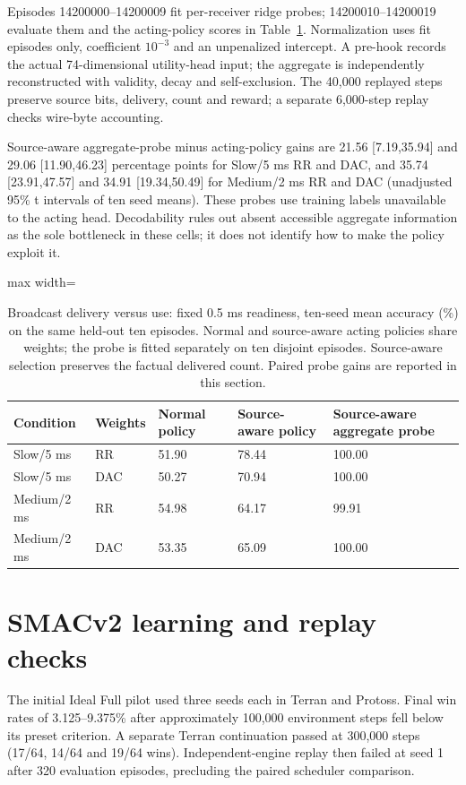 \documentclass[11pt,a4paper]{article}
\begin{document}
Episodes 14200000--14200009 fit per-receiver ridge probes; 14200010--14200019 evaluate them and the acting-policy scores in Table~\ref{tab:broadcast_use}. Normalization uses fit episodes only, coefficient $10^{-3}$ and an unpenalized intercept. A pre-hook records the actual 74-dimensional utility-head input; the aggregate is independently reconstructed with validity, decay and self-exclusion. The 40,000 replayed steps preserve source bits, delivery, count and reward; a separate 6,000-step replay checks wire-byte accounting.

Source-aware aggregate-probe minus acting-policy gains are 21.56 [7.19,35.94] and 29.06 [11.90,46.23] percentage points for Slow/5 ms RR and DAC, and 35.74 [23.91,47.57] and 34.91 [19.34,50.49] for Medium/2 ms RR and DAC (unadjusted 95\% t intervals of ten seed means). These probes use training labels unavailable to the acting head. Decodability rules out absent accessible aggregate information as the sole bottleneck in these cells; it does not identify how to make the policy exploit it.
\begin{table}[htbp]\centering\footnotesize
\caption{Broadcast delivery versus use: fixed 0.5 ms readiness, ten-seed mean accuracy (\%) on the same held-out ten episodes. Normal and source-aware acting policies share weights; the probe is fitted separately on ten disjoint episodes. Source-aware selection preserves the factual delivered count. Paired probe gains are reported in this section.}\label{tab:broadcast_use}
\vspace{3mm}
\begin{adjustbox}{max width=\linewidth}\begin{tabular}{lllll}\toprule
Condition & Weights & Normal policy & Source-aware policy & Source-aware aggregate probe\\\midrule
Slow/5 ms & RR & 51.90 & 78.44 & 100.00\\
Slow/5 ms & DAC & 50.27 & 70.94 & 100.00\\
Medium/2 ms & RR & 54.98 & 64.17 & 99.91\\
Medium/2 ms & DAC & 53.35 & 65.09 & 100.00\\
\bottomrule\end{tabular}\end{adjustbox}\end{table}
\FloatBarrier
\section{SMACv2 learning and replay checks}
The initial Ideal Full pilot used three seeds each in Terran and Protoss. Final win rates of 3.125--9.375\% after approximately 100,000 environment steps fell below its preset criterion. A separate Terran continuation passed at 300,000 steps (17/64, 14/64 and 19/64 wins). Independent-engine replay then failed at seed 1 after 320 evaluation episodes, precluding the paired scheduler comparison.
\end{document}
